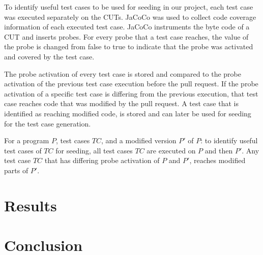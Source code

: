 \documentclass[12pt, a4paper]{article}
\begin{document}
To identify useful test cases to be used for seeding in our project, each test case was executed separately on the CUTs. JaCoCo was used to collect code coverage information of each executed test case. JaCoCo instruments the byte code of a CUT and inserts probes. For every probe that a test case reaches, the value of the probe is changed from false to true to indicate that the probe was activated and covered by the test case.

The probe activation of every test case is stored and compared to the probe activation of the previous test case execution before the pull request. If the probe activation of a specific test case is differing from the previous execution, that test case reaches code that was modified by the pull request. A test case that is identified as reaching modified code, is stored and can later be used for seeding for the test case generation. 

For a program $P$, test cases $TC$, and a modified version $P'$ of $P$: to identify useful test cases of $TC$ for seeding, all test cases $TC$ are executed on $P$ and then $P'$. Any test case $TC$ that has differing probe activation of $P$ and $P'$, reaches modified parts of $P'$.



\section{Results}


\section{Conclusion}




\newpage
{} %
\printbibliography %



\end{document}
